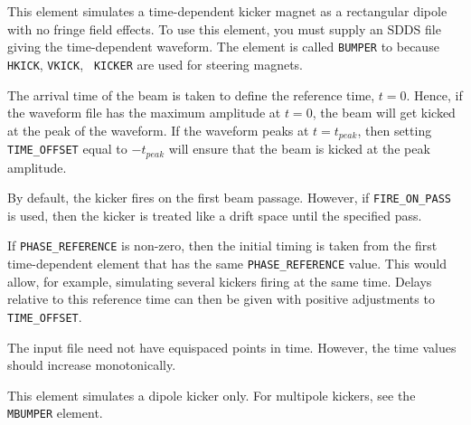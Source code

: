 This element simulates a time-dependent kicker magnet as a rectangular
dipole with no fringe field effects.  To use this element, you must
supply an SDDS file giving the time-dependent waveform.  The element
is called {\tt BUMPER} to because {\tt HKICK}, {\tt VKICK}, {\tt
KICKER} are used for steering magnets.

The arrival time of the beam is taken to define the reference time,
$t=0$.  Hence, if the waveform file has the maximum amplitude at
$t=0$, the beam will get kicked at the peak of the waveform.  If the waveform
peaks at $t=t_{peak}$, then setting \verb|TIME_OFFSET| equal to $-t_{peak}$
will ensure that the beam is kicked at the peak amplitude.

By default, the kicker fires on the first beam passage.  However, if 
\verb|FIRE_ON_PASS| is used, then the kicker is treated like a drift space until
the specified pass.

If \verb|PHASE_REFERENCE| is non-zero, then the initial timing is
taken from the first time-dependent element that has the same
\verb|PHASE_REFERENCE| value.  This would allow, for example,
simulating several kickers firing at the same time.  Delays relative
to this reference time can then be given with positive adjustments to
\verb|TIME_OFFSET|.

The input file need not have equispaced points in time.  However, the
time values should increase monotonically.

This element simulates a dipole kicker only.  For multipole kickers, see the
{\tt MBUMPER} element.